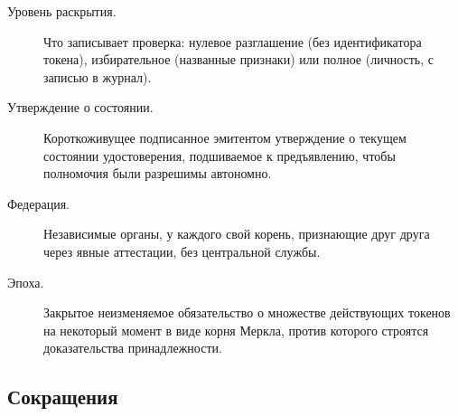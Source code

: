 \begin{description}
  \item[Уровень раскрытия.] Что записывает проверка: нулевое разглашение (без идентификатора токена), избирательное (названные признаки) или полное (личность, с записью в журнал).
  \item[Утверждение о состоянии.] Короткоживущее подписанное эмитентом утверждение о текущем состоянии удостоверения, подшиваемое к предъявлению, чтобы полномочия были разрешимы автономно.
  \item[Федерация.] Независимые органы, у каждого свой корень, признающие друг друга через явные аттестации, без центральной службы.
  \item[Эпоха.] Закрытое неизменяемое обязательство о множестве действующих токенов на некоторый момент в виде корня Меркла, против которого строятся доказательства принадлежности.
\end{description}

\subsection*{Сокращения}

